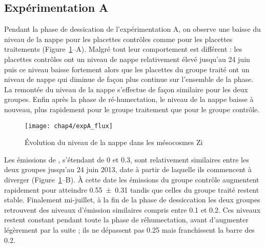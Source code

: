 \subsection{Expérimentation A}

Pendant la phase de dessication de l'expérimentation A, on observe une baisse du niveau de la nappe pour les placettes contrôles comme pour les placettes traitements (Figure~\ref{fig:HMzi}--A).
Malgré tout leur comportement est différent : les placettes contrôles ont un niveau de nappe relativement élevé jusqu'au 24 juin puis ce niveau baisse fortement alors que les placettes du groupe traité ont un niveau de nappe qui diminue de façon plus continue sur l'ensemble de la phase.
La remontée du niveau de la nappe s'effectue de façon similaire pour les deux groupes.
Enfin après la phase de ré-humectation, le niveau de la nappe baisse à nouveau, plus rapidement pour le groupe traitement que pour le groupe contrôle.


\begin{figure}
\centering
\texttt{[image: chap4/expA\_flux]}
\caption{Évolution du niveau de la nappe dans les mésocosmes Zi}
\label{fig:HMzi}
\end{figure}


Les émissions de \chh, s'étendant de 0 et \SI{0.3}{\uml}, sont relativement similaires entre les deux groupes jusqu'au 24 juin 2013, date à partir de laquelle ils commencent à diverger (Figure~\ref{fig:HMzi}--B).
À cette date les émissions du groupe contrôle augmentent rapidement pour atteindre \SI{0.55(031)}{\uml} tandis que celles du groupe traité restent stable.
Finalement mi-juillet, à la fin de la phase de dessiccation les deux groupes retrouvent des niveaux d'émission similaires compris entre \num{0.1} et \SI{0.2}{\uml}.
Ces niveaux restent constant pendant toute la phase de réhumectation, avant d'augmenter légèrement par la suite ; ils ne dépassent pas \SI{0.25}{\uml} mais franchissent la barre des \SI{0.2}{\uml}.

